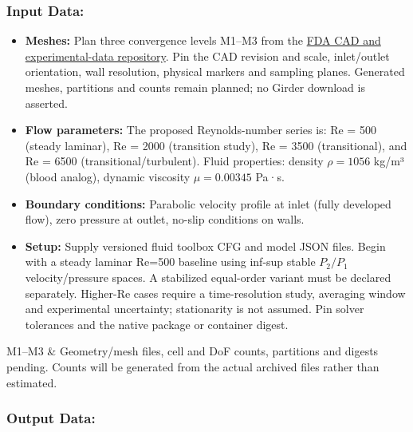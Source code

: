 \subsubsection{Input Data:}
  \begin{itemize}
  \item \textbf{Meshes:} Plan three convergence levels M1--M3 from the
  \href{https://github.com/OSEL-DAM/CFD-and-Blood-Damage-Benchmarks}{FDA CAD and experimental-data repository}.
  Pin the CAD revision and scale, inlet/outlet orientation, wall resolution,
  physical markers and sampling planes. Generated meshes, partitions and counts
  remain planned; no Girder download is asserted.
  \item \textbf{Flow parameters:} The proposed Reynolds-number series is: Re = 500 (steady laminar), Re = 2000 (transition study), Re = 3500 (transitional), and Re = 6500 (transitional/turbulent). Fluid properties: density $\rho = 1056$ kg/m³ (blood analog), dynamic viscosity $\mu = 0.00345$ Pa·s.
  
  \item \textbf{Boundary conditions:} Parabolic velocity profile at inlet (fully developed flow), zero pressure at outlet, no-slip conditions on walls.
  
  \item \textbf{Setup:} Supply versioned fluid toolbox CFG and model JSON
  files. Begin with a steady laminar Re=500 baseline using inf-sup stable
  $P_2/P_1$ velocity/pressure spaces. A stabilized equal-order variant must be
  declared separately. Higher-Re cases require a time-resolution study,
  averaging window and experimental uncertainty; stationarity is not assumed.
  Pin solver tolerances and the native package or container digest.
  \end{itemize}

\begin{FicheMetadataTable}
M1--M3 & Geometry/mesh files, cell and DoF counts, partitions and digests pending.
Counts will be generated from the actual archived files rather than estimated. \\
\end{FicheMetadataTable}

\subsubsection{Output Data:}

